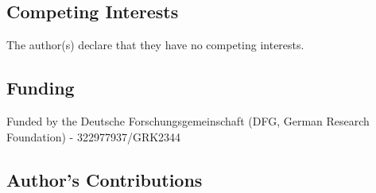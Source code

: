 \documentclass[a4paper,num-refs]{oup-contemporary}
\begin{document}

\subsection{Competing Interests}

The author(s) declare that they have no competing interests.



\subsection{Funding}

Funded by the Deutsche Forschungsgemeinschaft (DFG, German
Research Foundation) - 322977937/GRK2344




\subsection{Author's Contributions}

\end{document}
